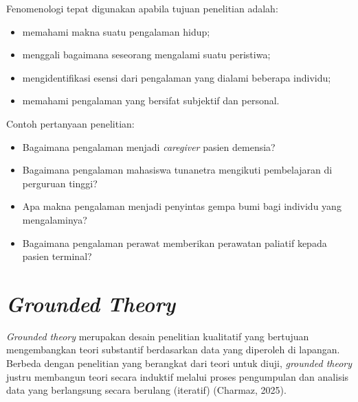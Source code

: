 \documentclass[
  indonesian,
  letterpaper,
  DIV=11,
  numbers=noendperiod]{scrreprt}
\providecommand{\tightlist}{%
  \setlength{\itemsep}{0pt}\setlength{\parskip}{0pt}}
\begin{document}
\begin{tcolorbox}[enhanced jigsaw, colframe=quarto-callout-tip-color-frame, toptitle=1mm, breakable, leftrule=.75mm, arc=.35mm, toprule=.15mm, colback=white, colbacktitle=quarto-callout-tip-color!10!white, bottomtitle=1mm, bottomrule=.15mm, titlerule=0mm, title={Kapan menggunakan fenomenologi?}, coltitle=black, left=2mm, opacitybacktitle=0.6, opacityback=0, rightrule=.15mm]

Fenomenologi tepat digunakan apabila tujuan penelitian adalah:

\begin{itemize}
\tightlist
\item
  memahami makna suatu pengalaman hidup;
\item
  menggali bagaimana seseorang mengalami suatu peristiwa;
\item
  mengidentifikasi esensi dari pengalaman yang dialami beberapa
  individu;
\item
  memahami pengalaman yang bersifat subjektif dan personal.
\end{itemize}

Contoh pertanyaan penelitian:

\begin{itemize}
\tightlist
\item
  Bagaimana pengalaman menjadi \emph{caregiver} pasien demensia?
\item
  Bagaimana pengalaman mahasiswa tunanetra mengikuti pembelajaran di
  perguruan tinggi?
\item
  Apa makna pengalaman menjadi penyintas gempa bumi bagi individu yang
  mengalaminya?
\item
  Bagaimana pengalaman perawat memberikan perawatan paliatif kepada
  pasien terminal?
\end{itemize}

\end{tcolorbox}

\section{\texorpdfstring{\emph{Grounded
Theory}}{Grounded Theory}}\label{grounded-theory}

\emph{Grounded theory} merupakan desain penelitian kualitatif yang
bertujuan mengembangkan teori substantif berdasarkan data yang diperoleh
di lapangan. Berbeda dengan penelitian yang berangkat dari teori untuk
diuji, \emph{grounded theory} justru membangun teori secara induktif
melalui proses pengumpulan dan analisis data yang berlangsung secara
berulang (iteratif) (Charmaz, 2025).
\end{document}
